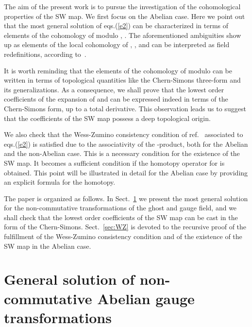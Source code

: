 \documentclass[a4paper,12pt]{article}
\begin{document}
The aim of the present work is to pursue the investigation of the cohomological
 properties of the SW map. We first focus on the Abelian case.
 Here we point out that the most general solution of eqs.(\ref{e2}) can be
 characterized in terms of elements of the cohomology of \coordHE{} modulo \coordHE{},
 \coordHE{}. The aforementioned ambiguities show up as elements of the local
 cohomology of \coordHE{}, \coordHE{}, and can be interpreted as field
 redefinitions, according to~\cite{Asakawa:1999cu,Jurco:2001rq,Brace:2001fj}.

It is worth reminding that the elements of the cohomology of \coordHE{} modulo \coordHE{}
 can be written in terms of topological quantities like the Chern-Simons
 three-form and its generalizations.
As a consequence, we shall prove that the lowest order coefficients of the
 expansion of \coordHE{} and \coordHE{} can be  expressed indeed in terms of the
 Chern-Simons form, up to a total derivative.
This observation leads us to suggest  that the coefficients of
 the SW map possess a deep topological origin. 
  
We also check that the Wess-Zumino consistency condition of 
 ref.~\cite{Brace:2001fj} associated to eqs.(\ref{e2})
 is  satisfied due to  the associativity of the \myHighlight{$\star$}\coordHE{}-product,
 both for the Abelian and the non-Abelian case.
This is a necessary condition for the existence of the SW map.
It becomes a sufficient condition if the homotopy operator for \myHighlight{$\Delta$}\coordHE{} is
 obtained. 
This point will be illustrated in detail for the Abelian case by providing an
 explicit formula for the homotopy.

The paper is organized as follows. In Sect.~\ref{2} we present the most general
 solution for the non-commutative transformations of the ghost and gauge field,
 and we shall check that the lowest order coefficients of the SW map can be
 cast in the form of the Chern-Simons.
Sect.~\ref{sec:WZ} is devoted to the recursive proof of the fulfillment of the
 Wess-Zumino consistency condition and of the existence of the SW map in the
 Abelian case.

\section{General solution of non-commutative Abelian gauge transformations}
\label{2}
\end{document}
